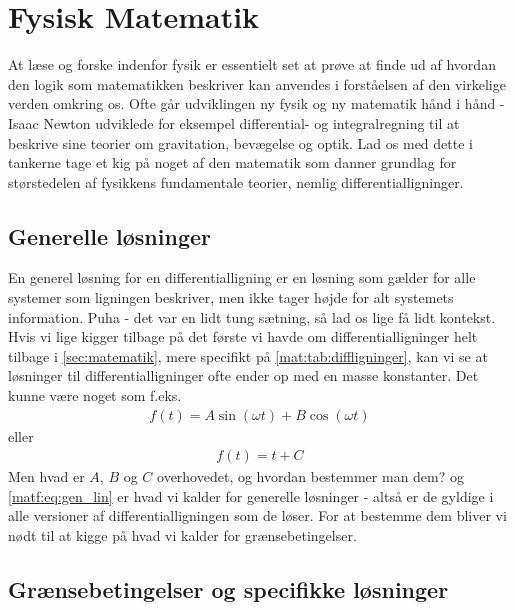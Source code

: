 \documentclass[crop=false, class=memoir]{standalone}
\begin{document}
\chapter{Fysisk Matematik} \label{sec:fysmat}

At læse og forske indenfor fysik er essentielt set at prøve at finde ud af hvordan den logik som matematikken beskriver kan anvendes i forståelsen af den virkelige verden omkring os. Ofte går udviklingen ny fysik og ny matematik hånd i hånd - Isaac Newton udviklede for eksempel differential- og integralregning til at beskrive sine teorier om gravitation, bevægelse og optik. Lad os med dette i tankerne tage et kig på noget af den matematik som danner grundlag for størstedelen af fysikkens fundamentale teorier, nemlig differentialligninger.

\section{Generelle løsninger}

En generel løsning for en differentialligning er en løsning som gælder for alle systemer som ligningen beskriver, men ikke tager højde for alt systemets information. Puha - det var en lidt tung sætning, så lad os lige få lidt kontekst. Hvis vi lige kigger tilbage på det første vi havde om differentialligninger helt tilbage i \cref{sec:matematik}, mere specifikt på \cref{mat:tab:diffligninger}, kan vi se at løsninger til differentialligninger ofte ender op med en masse konstanter. Det kunne være noget som f.eks.
\begin{align}
    f(t) = A\sin{(\omega t)} + B \cos{(\omega t)}
    \label{matf:eq:gen_trig}
\end{align}
eller
\begin{align}
    f(t) = t + C
    \label{matf:eq:gen_lin}
\end{align}
Men hvad er $A$, $B$ og $C$ overhovedet, og hvordan bestemmer man dem?  og \cref{matf:eq:gen_lin} er hvad vi kalder for generelle løsninger - altså er de gyldige i alle versioner af differentialligningen som de løser. For at bestemme dem bliver vi nødt til at kigge på hvad vi kalder for grænsebetingelser.

\section{Grænsebetingelser og specifikke løsninger}
\end{document}
